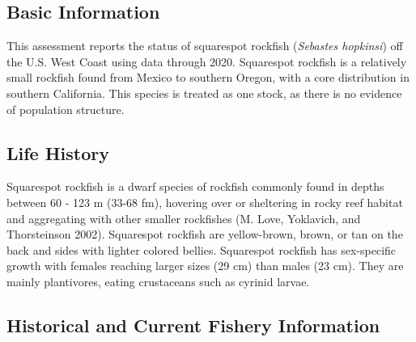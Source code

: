 \documentclass[11pt,
  english,
  a4paper,
]{article}
\begin{document}
\leavevmode\tagmcend\tagstructend


\hypertarget{basic-information}{%
\subsection{Basic Information}\label{basic-information}}

\leavevmode\tagmcend\tagstructend


This assessment reports the status of squarespot rockfish (\emph{Sebastes hopkinsi}) off the U.S. West Coast using data through 2020. Squarespot rockfish is a relatively small rockfish found from Mexico to southern Oregon, with a core distribution in southern California. This species is treated as one stock, as there is no evidence of population structure.

\leavevmode\tagmcend\tagstructend\par


\hypertarget{life-history}{%
\subsection{Life History}\label{life-history}}

\leavevmode\tagmcend\tagstructend


Squarespot rockfish is a dwarf species of rockfish commonly found in depths between 60 - 123 m (33-68 fm), hovering over or sheltering in rocky reef habitat and aggregating with other smaller rockfishes {(M. Love, Yoklavich, and Thorsteinson 2002)\leavevmode\tagmcend\tagstructend}. Squarespot rockfish are yellow-brown, brown, or tan on the back and sides with lighter colored bellies. Squarespot rockfish has sex-specific growth with females reaching larger sizes (29 cm) than males (23 cm). They are mainly plantivores, eating crustaceans such as cyrinid larvae.

\leavevmode\tagmcend\tagstructend\par


\hypertarget{historical-and-current-fishery-information}{%
\subsection{Historical and Current Fishery Information}\label{historical-and-current-fishery-information}}
\end{document}
